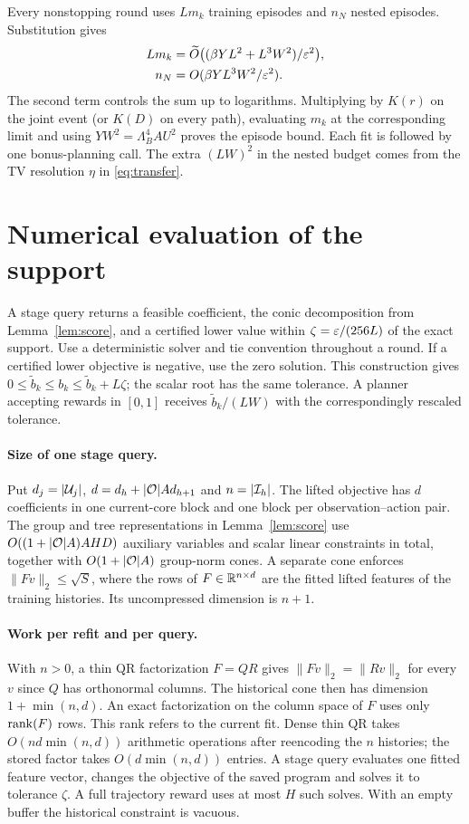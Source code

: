 Every nonstopping round uses $Lm_k$ training episodes and $n_N$ nested episodes. Substitution gives
\begin{align*}
 Lm_k&=\widetilde O\big((\beta YL^2+L^3W^2)/\varepsilon^2\big),\\
 n_N&=O(\beta YL^3W^2/\varepsilon^2).
\end{align*}
The second term controls the sum up to logarithms. Multiplying by $K(r)$ on the joint event (or $K(D)$ on every path), evaluating $m_k$ at the corresponding limit and using $YW^2=\Lambda_B^4 AU^2$ proves the episode bound. Each fit is followed by one bonus-planning call. The extra $(LW)^2$ in the nested budget comes from the TV resolution $\eta$ in \eqref{eq:transfer}.

\section{Numerical evaluation of the support}\label{app:numeric}
A stage query returns a feasible coefficient, the conic decomposition from Lemma~\ref{lem:score}, and a certified lower value within $\zeta=\varepsilon/(256L)$ of the exact support. Use a deterministic solver and tie convention throughout a round. If a certified lower objective is negative, use the zero solution. This construction gives $0\le\widetilde b_k\le b_k\le\widetilde b_k+L\zeta$; the scalar root has the same tolerance. A planner accepting rewards in $[0,1]$ receives $\widetilde b_k/(LW)$ with the correspondingly rescaled tolerance.

\paragraph{Size of one stage query.}
Put $d_j=|\mathcal U_j|$, $d=d_h+|\mathcal O|A d_{h+1}$ and $n=|\mathcal I_h|$. The lifted objective has $d$ coefficients in one current-core block and one block per observation--action pair. The group and tree representations in Lemma~\ref{lem:score} use $O((1+|\mathcal O|A)AHD)$ auxiliary variables and scalar linear constraints in total, together with $O(1+|\mathcal O|A)$ group-norm cones. A separate cone enforces $\|Fv\|_2\le\sqrt S$, where the rows of $F\in\mathbb R^{n\times d}$ are the fitted lifted features of the training histories. Its uncompressed dimension is $n+1$.

\paragraph{Work per refit and per query.}
With $n>0$, a thin QR factorization $F=QR$ gives $\|Fv\|_2=\|Rv\|_2$ for every $v$ since $Q$ has orthonormal columns. The historical cone then has dimension $1+\min(n,d)$. An exact factorization on the column space of $F$ uses only $\operatorname{rank}(F)$ rows. This rank refers to the current fit. Dense thin QR takes $O(nd\min(n,d))$ arithmetic operations after reencoding the $n$ histories; the stored factor takes $O(d\min(n,d))$ entries. A stage query evaluates one fitted feature vector, changes the objective of the saved program and solves it to tolerance $\zeta$. A full trajectory reward uses at most $H$ such solves. With an empty buffer the historical constraint is vacuous.

